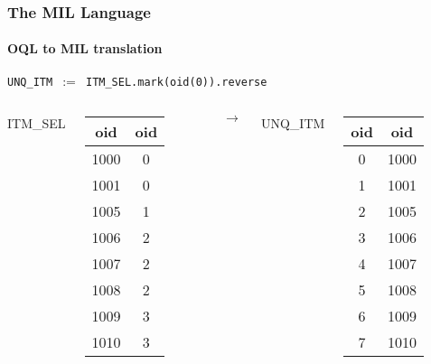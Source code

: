 \documentclass{beamer}
\begin{document}
\begin{frame}
  \frametitle{The MIL Language}
  \framesubtitle{OQL to MIL translation}

  \begin{block}{}
  {\tt UNQ\_ITM $:=$ ITM\_SEL.mark(oid(0)).reverse}
  \end{block}

  \begin{columns}

  \column{1cm}

  ITM\_SEL
  \begin{tabular}{|c|c|}
    \hline
    oid & oid \\
    \hline
    1000 & 0 \\
    1001 & 0 \\
    1005 & 1 \\
    1006 & 2 \\
    1007 & 2 \\
    1008 & 2 \\
    1009 & 3 \\
    1010 & 3 \\
    \hline
  \end{tabular}

  \column{1cm}

  $\longrightarrow$

  \column{1cm}

  UNQ\_ITM
  \begin{tabular}{|c|c|}
    \hline
    oid & oid \\
    \hline
    0 & 1000 \\
    1 & 1001 \\
    2 & 1005 \\
    3 & 1006 \\
    4 & 1007 \\
    5 & 1008 \\
    6 & 1009 \\
    7 & 1010 \\
    \hline
  \end{tabular}

  \end{columns}

\end{frame}
\end{document}
